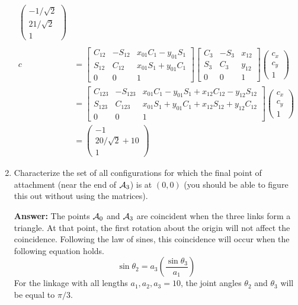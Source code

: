 \documentclass[10pt,letterpaper]{article}
\begin{document}
\begin{enumerate}
\begin{align*}
\begin{pmatrix}
-1/\sqrt{2} \\
21/\sqrt{2} \\ 
1
\end{pmatrix} \\
\\
c &= \begin{bmatrix}
C_{12} & -S_{12} & x_{01}C_1-y_{01}S_1 \\
S_{12} &  C_{12} & x_{01}S_1+y_{01}C_1 \\
0 & 0 & 1
\end{bmatrix} \begin{bmatrix}
C_{3} & -S_{3} & x_{12} \\
S_{3} &  C_{3} & y_{12} \\
0 & 0 & 1
\end{bmatrix} \begin{pmatrix}
c_x \\
c_y \\
1
\end{pmatrix} \\
&= \begin{bmatrix}
C_{123} & -S_{123}  &  x_{01}C_1 - y_{01}S_1 + x_{12}C_{12} - y_{12}S_{12} \\
S_{123} &  C_{123}  &  x_{01}S_1 + y_{01}C_1 + x_{12}S_{12} + y_{12}C_{12} \\
0 & 0 & 1
\end{bmatrix} \begin{pmatrix}
c_x \\
c_y \\
1
\end{pmatrix} \\
&= \begin{pmatrix}
-1 \\
20/\sqrt{2} + 10 \\ 
1
\end{pmatrix}
\end{align*}

\item Characterize the set of all configurations for which the final point of attachment (near the end of  $ {\cal A}_3$) is at $ (0,0)$ (you should be able to figure this out without using the matrices).

\textbf{Answer: } 
The points ${\cal A}_0$ and ${\cal A}_3$ are coincident when the three links form a triangle. At that point, the first rotation about the origin will not affect the coincidence. 
Following the law of sines, this coincidence will occur when the following equation holds.
\begin{equation*}
\sin\theta_2 = a_3 \left( \frac{\sin\theta_3}{a_1} \right)
\end{equation*}
For the linkage with all lengths $a_1, a_2, a_3 = 10$, the joint angles $\theta_2$ and $\theta_3$ will be equal to $\pi/3$.
\end{enumerate}
\end{document}
